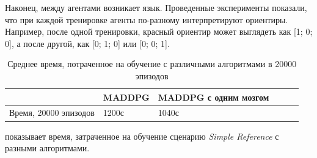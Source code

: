 Наконец, между агентами возникает язык. Проведенные эксперименты показали, что при каждой тренировке агенты по-разному интерпретируют ориентиры. Например, после одной тренировки, красный ориентир может выглядеть как [1; 0; 0], а после другой, как [0; 1; 0] или [0; 0; 1].

\begin{table}[t!]
	\centering\small
	\caption{Среднее время, потраченное на обучение с различными алгоритмами в 20000 эпизодов}
	\label{tab-sr-time}
	\begin{tabular}{|l|l|l|l|l|l|}
		\hline
		&MADDPG&MADDPG с одним мозгом\\
		\hline
		Время, 20000 эпизодов&1200с&1040с\\ \hline
	\end{tabular}
	\normalsize%
\end{table}

 показывает время, затраченное на обучение сценарию \textit{Simple Reference} с разными алгоритмами.